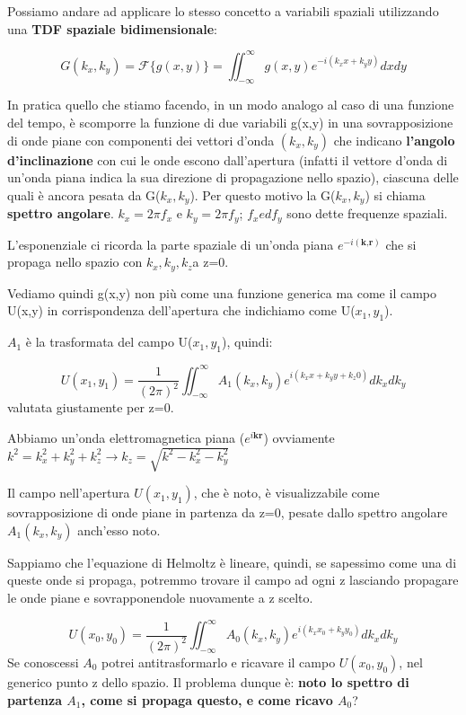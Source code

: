 \documentclass{article}
\begin{document}
Possiamo andare ad applicare lo stesso concetto a variabili spaziali utilizzando una \textbf{TDF spaziale bidimensionale}: 

\begin{equation} G(k_{x}, k_{y})=\mathscr{F} 	 \{g(x,y)\} =\iint_{-\infty}^{\infty} g(x,y) e^{-i( k_{x} x +k_{y} y)}dxdy 
\end{equation}

In pratica quello che stiamo facendo, in un modo analogo al caso di una funzione del tempo, è scomporre la funzione di due variabili g(x,y) in una sovrapposizione di onde piane con componenti dei vettori d'onda $(k_x, k_y)$ che indicano \textbf{l'angolo d'inclinazione} con cui le onde escono dall'apertura (infatti il vettore d'onda di un'onda piana indica la sua direzione di propagazione nello spazio), ciascuna delle quali è ancora pesata da G($k_x, k_y$). Per questo motivo la G($k_x, k_y$) si chiama \textbf{spettro angolare}.
$k_x=2\pi f_x$ e $k_y=2\pi f_y$; $f_x ed f_y$ sono dette frequenze spaziali.

L'esponenziale ci ricorda la parte spaziale di un'onda piana $e^{-i(\textbf{k,r})}$ che si propaga nello spazio con $k_{x},k_{y},k_{z}$a z=0.

Vediamo quindi g(x,y) non più come una funzione generica ma come il campo U(x,y) in corrispondenza dell'apertura che indichiamo come U($x_1,y_1$).

$A_{1}$ è la trasformata del campo U($x_1,y_1$), quindi:

\begin{equation}
U(x_{1},y_{1})=\frac{1}{(2\pi)^{2}}\iint_{- \infty}^{\infty} A_{1}(k_{x},k_{y}) e^{i( k_{x} x +k_{y} y +k_{z} 0)}dk_{x}dk_{y} 		
\end{equation}
valutata giustamente per z=0.

Abbiamo un'onda elettromagnetica piana ($ e^{i \textbf{k} \textbf{r}}$) ovviamente  $k ^{2} = k_{x} ^{2} +k_{y} ^{2} +k_{z}^{2} \longrightarrow k_{z}=\sqrt{k ^{2} - k_{x} ^{2} - k_{y} ^{2}}$ 

Il campo nell'apertura $U(x_{1},y_{1})$, che è noto, è visualizzabile come sovrapposizione di onde piane in partenza da z=0, pesate dallo spettro angolare $A_{1}(k_{x},k_{y})$ anch'esso noto.

Sappiamo che l'equazione di Helmoltz è lineare, quindi, se sapessimo come una di queste onde si propaga, potremmo trovare il campo ad ogni z lasciando propagare le onde piane e sovrapponendole nuovamente a z scelto.

\begin{equation}
U(x_{0},y_{0})=\frac{1}{(2\pi)^{2}}\iint_{-\infty}^{\infty} A_{0}(k_{x},k_{y} ) e^{i( k_{x} x_{0} +k_{y} y_{0})}dk_{x}dk_{y} 				
\end{equation}
Se conoscessi $A_{0}$ potrei antitrasformarlo e ricavare il campo $U(x_{0},y_{0})$, nel generico punto z dello spazio.
Il problema dunque è: \textbf{noto lo spettro di partenza $A_{1}$, come si propaga questo, e come ricavo $A_{0}$}?
\end{document}
